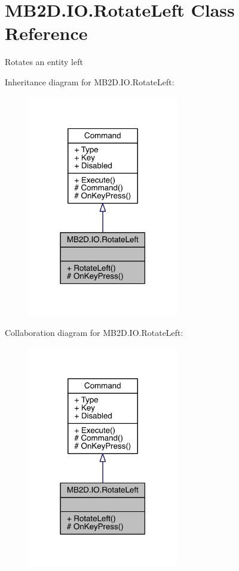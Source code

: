 \hypertarget{class_m_b2_d_1_1_i_o_1_1_rotate_left}{}\section{M\+B2\+D.\+I\+O.\+Rotate\+Left Class Reference}
\label{class_m_b2_d_1_1_i_o_1_1_rotate_left}


Rotates an entity left  




Inheritance diagram for M\+B2\+D.\+I\+O.\+Rotate\+Left\+:
\nopagebreak
\begin{figure}[H]
\begin{center}
\leavevmode
\includegraphics[width=186pt]{class_m_b2_d_1_1_i_o_1_1_rotate_left__inherit__graph}
\end{center}
\end{figure}


Collaboration diagram for M\+B2\+D.\+I\+O.\+Rotate\+Left\+:
\nopagebreak
\begin{figure}[H]
\begin{center}
\leavevmode
\includegraphics[width=186pt]{class_m_b2_d_1_1_i_o_1_1_rotate_left__coll__graph}
\end{center}
\end{figure}
